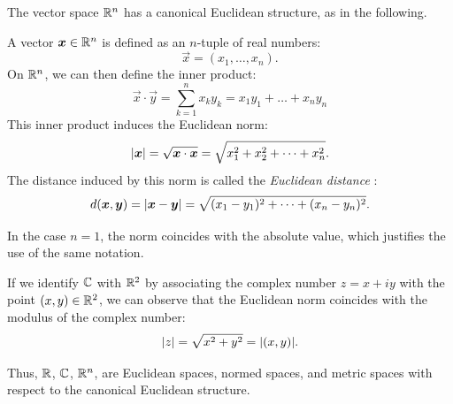 The vector space ${\mathbb R}^n$ has a canonical Euclidean structure,
as in the following.

\begin{definition}%
\label{def:124124}%
\mymark{*}%
A vector $\boldsymbol x\in {\mathbb R}^n$ is defined as an $n$-tuple of real numbers:
\[
  \vec x = (x_1, \dots, x_n).
\]
On ${\mathbb R}^n$, we can then define the inner product:
\[
  \vec x\cdot \vec y
   = \sum_{k=1}^n x_k y_k
   = x_1 y_1 + \dots + x_n y_n
\]
This inner product induces the Euclidean norm:
%
\[
  {\left|\boldsymbol x\right|} = \sqrt{\boldsymbol x \cdot \boldsymbol x}
  = \sqrt{x_1^2 + x_2^2+ \dots + x_n^2}.
\]
The distance induced by this norm is called the \emph{Euclidean distance}%
%
:
\[
  d(\boldsymbol x, \boldsymbol y)
  = {\left|\boldsymbol x-\boldsymbol y\right|}
  = \sqrt{(x_1-y_1)^2 + \dots + (x_n-y_n)^2}.
\]

In the case $n=1$, the norm coincides with the absolute value, which
justifies the use of the same notation.

If we identify ${\mathbb C}$ with ${\mathbb R}^2$ by associating the complex number $z=x+iy$
with the point $(x,y)\in {\mathbb R}^2$, we can observe that the Euclidean norm
coincides with the modulus of the complex number:
\[
  {\left|z\right|} = \sqrt{x^2 + y^2} = {\left|(x,y)\right|}.
\]

Thus, ${\mathbb R}$, ${\mathbb C}$, ${\mathbb R}^n$,
are Euclidean spaces, normed spaces, and metric spaces with respect to the
canonical
Euclidean structure.
\end{definition}

